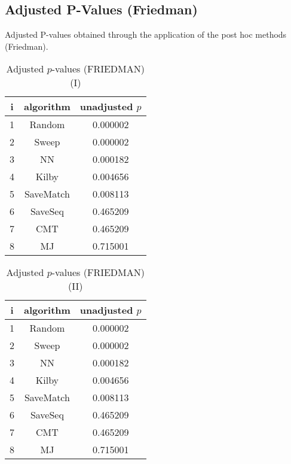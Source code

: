 \documentclass[a4paper,10pt]{article}
\begin{document}
\begin{landscape}
\section{Adjusted P-Values (Friedman)}


Adjusted P-values obtained through the application of the post hoc methods (Friedman).

\begin{table}[!htp]
\centering\small
\begin{tabular}{ccc}
i&algorithm&unadjusted $p$\\
\hline1&Random&0.000002\\2&Sweep&0.000002\\3&NN&0.000182\\4&Kilby&0.004656\\5&SaveMatch&0.008113\\6&SaveSeq&0.465209\\7&CMT&0.465209\\8&MJ&0.715001\\\hline
\end{tabular}
\caption{Adjusted $p$-values (FRIEDMAN) (I)}
\end{table}
\begin{table}[!htp]
\centering\small
\begin{tabular}{ccc}
i&algorithm&unadjusted $p$\\
\hline1&Random&0.000002\\2&Sweep&0.000002\\3&NN&0.000182\\4&Kilby&0.004656\\5&SaveMatch&0.008113\\6&SaveSeq&0.465209\\7&CMT&0.465209\\8&MJ&0.715001\\\hline
\end{tabular}
\caption{Adjusted $p$-values (FRIEDMAN) (II)}
\end{table}

\newpage
\end{landscape}
\end{document}
